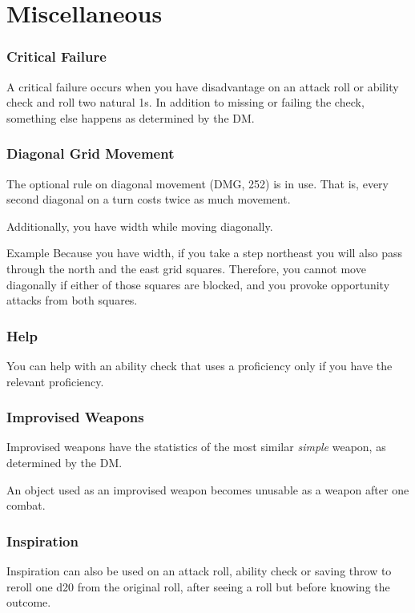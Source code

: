\documentclass[House_Rules.tex]{subfiles}
\begin{document}
\section{Miscellaneous}

\subsubsection{Critical Failure}
A critical failure occurs when you have disadvantage on an attack roll or ability check and roll two natural 1s. In addition to missing or failing the check, something else happens as determined by the DM. 

\subsubsection{Diagonal Grid Movement}

The optional rule on diagonal movement (DMG, 252) is in use. That is, every second diagonal on a turn costs twice as much movement.

Additionally, you have width while moving diagonally.

\begin{DndComment}{Example}
Because you have width, if you take a step northeast you will also pass through the north and the east grid squares. Therefore, you cannot move diagonally if either of those squares are blocked, and you provoke opportunity attacks from both squares.
\end{DndComment}

\subsubsection{Help}
You can help with an ability check that uses a proficiency only if you have the relevant proficiency.

\subsubsection{Improvised Weapons}
Improvised weapons have the statistics of the most similar \textit{simple} weapon, as determined by the DM.

An object used as an improvised weapon becomes unusable as a weapon after one combat.

\subsubsection{Inspiration}
Inspiration can also be used on an attack roll, ability check or saving throw to reroll one d20 from the original roll, after seeing a roll but before knowing the outcome.
\end{document}

